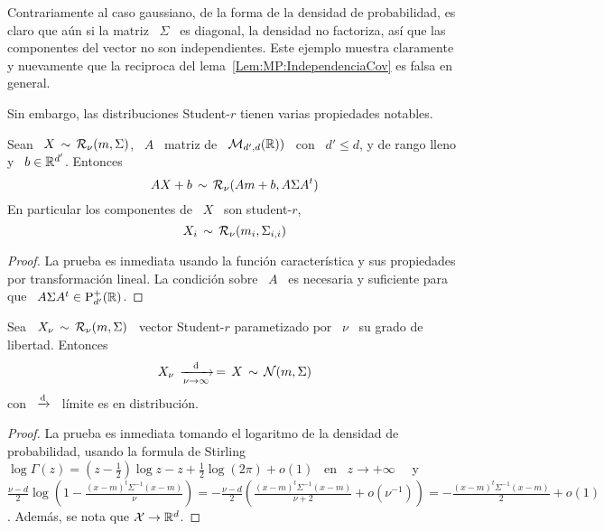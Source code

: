 Contrariamente al caso gaussiano, de la forma de la densidad de probabilidad, es
claro que a\'un si la matriz \ $\Sigma$ \ es diagonal, la densidad no factoriza,
as\'i  que las  componentes  del  vector no  son  independientes.  Este  ejemplo
muestra     claramente     y     nuevamente     que     la     reciproca     del
lema~\ref{Lem:MP:IndependenciaCov} es falsa en general.

Sin embargo, las distribuciones Student-$r$ tienen varias propiedades notables.

\begin{lema}
\label{Lem:MP:StabilidadLinealStudentR}
%
  Sean \ $X \, \sim \,  \mathcal{R}_\nu(m,\Sigma)$, \ $A$ \ matriz de \ $\mathcal{M}_{d',d}(\mathbb{R}))$
  \ con \ $d' \le d$, y de rango lleno y \ $b \in \mathbb{R}^{d'}$. Entonces
  \[
  A X + b\, \sim \, \mathcal{R}_\nu( A m + b , A \Sigma A^t)
  \]
  En particular los componentes de \ $X$ \ son student-$r$,
  \[
  X_i \, \sim \, \mathcal{R}_\nu(m_i , \Sigma_{i,i} )
  \]
\end{lema}
\begin{proof}
  La prueba es inmediata usando  la funci\'on caracter\'istica y sus propiedades
  por  transformaci\'on lineal.  La condici\'on  sobre \  $A$ \  es  necesaria y
  suficiente para que \ $A \Sigma A^t \in \mathrm{P}_{d'}^+(\mathbb{R})$.
\end{proof}

\begin{lema}
\label{Lem:MP:LimiteStudentRGaussiana}
%
  Sea \  $X_\nu \, \sim  \, \mathcal{R}_\nu(m,\Sigma)$ \ vector  Student-$r$ parametizado
  por \ $\nu$ \ su grado de libertad. Entonces
  \[
  X_\nu \, \xrightarrow[\nu \to \infty]{\mathrm{d}} \, = \, X \, \sim \, \mathcal{N}(m,\Sigma)
  \]
  con \ $\displaystyle \xrightarrow[]{\mathrm{d}}$ \ l\'imite es en distribuci\'on.
\end{lema}
\begin{proof}
  La prueba  es inmediata tomando el  logaritmo de la  densidad de probabilidad,
  usando la  formula de Stirling \  $\log\Gamma(z) = \left( z  - \frac12 \right)
  \log z - z  + \frac12 \log(2 \pi) + o(1)$ \  en \ $z \to +\infty$~\cite{Sti30,
    AbrSte70,  GraRyz15} \  y \  $\frac{\nu-d}{2} \log\left(  1  - \frac{(x-m)^t
      \Sigma^{-1} (x-m)}{\nu}  \right) = -  \frac{\nu-d}{2} \left( \frac{(x-m)^t
      \Sigma^{-1}  (x-m)}{\nu+2}   +  o\left(  \nu^{-1}  \right)   \right)  =  -
  \frac{(x-m)^t \Sigma^{-1}  (x-m)}{2} +  o(1)$. Adem\'as, se  nota que  $\mathcal{X} \to
  \mathbb{R}^d$.
\end{proof}

